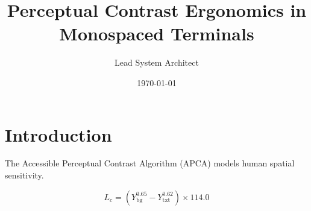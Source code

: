 \documentclass[11pt,a4paper]{article}
\title{Perceptual Contrast Ergonomics in Monospaced Terminals}
\author{Lead System Architect}
\date{\today}
\begin{document}
\maketitle

\section{Introduction}
The Accessible Perceptual Contrast Algorithm (APCA) models human spatial sensitivity.

\begin{equation}
    L_c = (Y_{\text{bg}}^{0.65} - Y_{\text{txt}}^{0.62}) \times 114.0
\end{equation}
\end{document}
